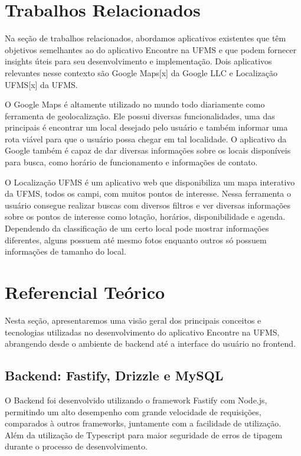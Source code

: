\documentclass[12pt]{article}
\begin{document}
\section{Trabalhos Relacionados}

Na seção de trabalhos relacionados, abordamos aplicativos existentes que têm objetivos semelhantes ao do aplicativo Encontre na UFMS e que podem fornecer insights úteis para seu desenvolvimento e implementação. Dois aplicativos relevantes nesse contexto são Google Maps[x] da Google LLC e Localização UFMS[x] da UFMS.

O Google Maps é altamente utilizado no mundo todo diariamente como ferramenta de geolocalização. Ele possui diversas funcionalidades, uma das principais é encontrar um local desejado pelo usuário e também informar uma rota viável para que o usuário possa chegar em tal localidade. O aplicativo da Google também é capaz de dar diversas informações sobre os locais disponíveis para busca, como horário de funcionamento e informações de contato.

O Localização UFMS é um aplicativo web que disponibiliza um mapa interativo da UFMS, todos os campi, com muitos pontos de interesse. Nessa ferramenta o usuário consegue realizar buscas com diversos filtros e ver diversas informações sobre os pontos de interesse como lotação, horários, disponibilidade e agenda. Dependendo da classificação de um certo local pode mostrar informações diferentes, alguns possuem até mesmo fotos enquanto outros só possuem informações de tamanho do local. 

\section{Referencial Teórico}

Nesta seção, apresentaremos uma visão geral dos principais conceitos e tecnologias utilizadas no desenvolvimento do aplicativo Encontre na UFMS, abrangendo desde o ambiente de backend até a interface do usuário no frontend.

\subsection{Backend: Fastify, Drizzle e MySQL}
O Backend foi desenvolvido utilizando o framework Fastify com Node.js, permitindo um alto desempenho com grande velocidade de requisições, comparados à outros frameworks, juntamente com a facilidade de utilização. Além da utilização de Typescript para maior seguridade de erros de tipagem durante o processo de desenvolvimento.
\end{document}
